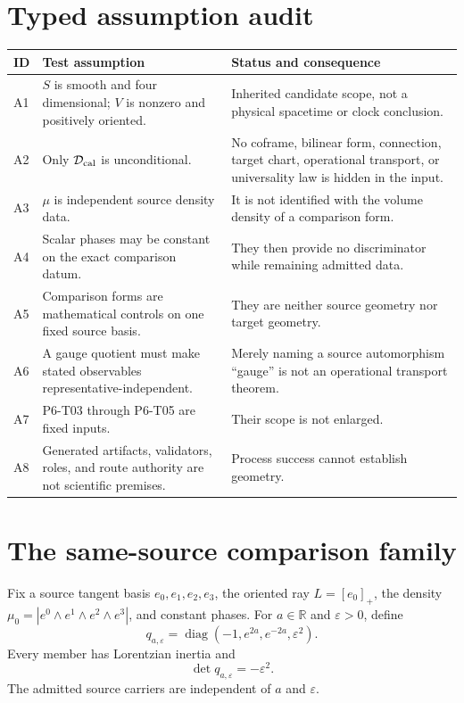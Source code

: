\documentclass[11pt]{article}
\newcommand{\diag}{\operatorname{diag}}
\begin{document}
\section{Typed assumption audit}

\begin{longtable}{>{\raggedright\arraybackslash}p{}
                  >{\raggedright\arraybackslash}p{}
                  >{\raggedright\arraybackslash}p{}}
\toprule
ID & Test assumption & Status and consequence\\
\midrule
\endhead
A1 & \(S\) is smooth and four dimensional; \(V\) is nonzero and positively
oriented. & Inherited candidate scope, not a physical spacetime or clock
conclusion.\\
A2 & Only \(\mathcal D_{\rm cal}\) is unconditional. & No coframe, bilinear
form, connection, target chart, operational transport, or universality law is
hidden in the input.\\
A3 & \(\mu\) is independent source density data. & It is not identified with
the volume density of a comparison form.\\
A4 & Scalar phases may be constant on the exact comparison datum. & They then
provide no discriminator while remaining admitted data.\\
A5 & Comparison forms are mathematical controls on one fixed source basis. &
They are neither source geometry nor target geometry.\\
A6 & A gauge quotient must make stated observables representative-independent.
& Merely naming a source automorphism ``gauge'' is not an operational
transport theorem.\\
A7 & P6-T03 through P6-T05 are fixed inputs. & Their scope is not enlarged.\\
A8 & Generated artifacts, validators, roles, and route authority are not
scientific premises. & Process success cannot establish geometry.\\
\bottomrule
\end{longtable}

\section{The same-source comparison family}

Fix a source tangent basis \(e_0,e_1,e_2,e_3\), the oriented ray
\(L=[e_0]_+\), the density
\(\mu_0=|e^0\wedge e^1\wedge e^2\wedge e^3|\), and constant phases. For
\(a\in\mathbb R\) and \(\varepsilon>0\), define
\[
 q_{a,\varepsilon}
 =\diag\!\left(-1,e^{2a},e^{-2a},\varepsilon^2\right).
\]
Every member has Lorentzian inertia and
\[
 \det q_{a,\varepsilon}=-\varepsilon^2.
\]
The admitted source carriers are independent of \(a\) and
\(\varepsilon\).
\end{document}
